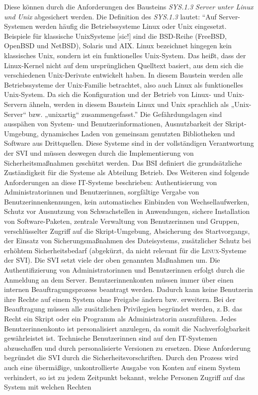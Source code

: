 Diese können durch die Anforderungen des Bausteins \textit{SYS.1.3 Server unter Linux und Unix} abgesichert werden. Die Definition des \textit{SYS.1.3} lautet: \enquote{Auf Server-Systemen werden häufig die Betriebssysteme Linux oder Unix eingesetzt. Beispiele für klassische UnixSysteme [sic!] sind die BSD-Reihe (FreeBSD, OpenBSD und NetBSD), Solaris und AIX. Linux bezeichnet hingegen kein klassisches Unix, sondern ist ein funktionelles Unix-System. Das heißt, dass der Linux-Kernel nicht auf dem ursprünglichen Quelltext basiert, aus dem sich die verschiedenen Unix-Derivate entwickelt haben. In diesem Baustein werden alle Betriebssysteme der Unix-Familie betrachtet, also auch Linux als funktionelles Unix-System. Da sich die	Konfiguration und der Betrieb von Linux- und Unix-Servern ähneln, werden in diesem Baustein Linux und Unix sprachlich als „Unix-Server“ bzw. „unixartig“ zusammengefasst.}\autocite[][S.\,]{bundesamt_fur_sicherheit_in_der_informationstechnik_bsi_it-grundschutz-kompendium_2020} Die Gefährdungslagen sind ausspähen von System- und Benutzerinformationen, Ausnutzbarkeit der Skript-Umgebung, dynamisches Laden von gemeinsam genutzten Bibliotheken und Software aus Drittquellen.\autocite[vgl.][S.\,480]{bundesamt_fur_sicherheit_in_der_informationstechnik_bsi_it-grundschutz-kompendium_2020} Diese Systeme sind in der vollständigen Verantwortung der \ac{SVI} und müssen deswegen durch die Implementierung von Sicherheitsmaßnahmen geschützt werden. Das \ac{BSI} definiert die grundsätzliche Zuständigkeit für die Systeme als Abteilung Betrieb. Des Weiteren sind folgende Anforderungen an diese IT-Systeme beschrieben: Authentisierung von Administratorinnen und Benutzerinnen, sorgfältige Vergabe von Benutzerinnenkennungen, kein automatisches Einbinden von Wechsellaufwerken, Schutz vor Ausnutzung von Schwachstellen in Anwendungen, sichere Installation von Software-Paketen, zentrale Verwaltung von Benutzerinnen und Gruppen, verschlüsselter Zugriff auf die Skript-Umgebung, Absicherung des Startvorgangs, der Einsatz von Sicherungsmaßnahmen des Dateisystems, zusätzlicher Schutz bei erhöhtem Sicherheitsbedarf (abgekürzt, da nicht relevant für die \textsc{Linux}-Systeme der \ac{SVI})\autocite[vgl.][S.\,480-482]{bundesamt_fur_sicherheit_in_der_informationstechnik_bsi_it-grundschutz-kompendium_2020}. Die \ac{SVI} setzt viele der oben genannten Maßnahmen um. Die Authentifizierung von Administratorinnen und Benutzerinnen erfolgt durch die Anmeldung an dem Server. Benutzerinnenkonten müssen immer über einen internen Beauftragungsprozess beantragt werden. Dadurch kann keine Benutzerin ihre Rechte auf einem System ohne Freigabe ändern bzw. erweitern. Bei der Beauftragung müssen alle zusätzlichen Privilegien begründet werden, z.\,B. das Recht ein Skript oder ein Programm als Administratorin auszuführen. Jedes Benutzerinnenkonto ist personalisiert anzulegen, da somit die Nachverfolgbarkeit gewährleistet ist. Technische Benutzerinnen sind auf den IT-Systemen abzuschaffen und durch personalisierte Versionen zu ersetzen. Diese Anforderung begründet die \ac{SVI} durch die Sicherheitsvorschriften. Durch den Prozess wird auch eine übermäßige, unkontrollierte Ausgabe von Konten auf einem System verhindert, so ist zu jedem Zeitpunkt bekannt, welche Personen Zugriff auf das System mit welchen Rechten 
